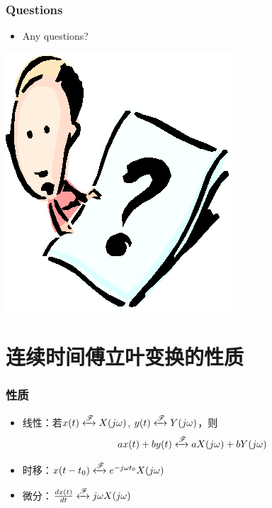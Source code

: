 \documentclass[CJKutf8,dvipsnames,table]{beamer}
\begin{document}
\begin{CJK*}{UTF8}{song}
  \begin{frame}
    \frametitle{Questions}
    \begin{itemize}
    \item Any questions?
    \end{itemize}
    \begin{center}
      \includegraphics[scale=.5]{question}
    \end{center}
  \end{frame}   

	\section{连续时间傅立叶变换的性质}

  \begin{frame}
    \frametitle{性质}
    \begin{itemize}
    \item 线性：若$x(t) \xleftrightarrow{\mathscr{F}} X(j\omega)$, $y(t)\xleftrightarrow{\mathscr{F}}Y(j\omega)$，则
    \[
    ax(t)+by(t) \xleftrightarrow{\mathscr{F}} aX(j\omega)+bY(j\omega)
    \]
    \item 时移：$x(t-t_0) \xleftrightarrow{\mathscr{F}} e^{-j\omega t_0}X(j\omega)$
    \item 微分：$\frac{dx(t)}{dt} \xleftrightarrow{\mathscr{F}} j\omega X(j\omega)$
	\end{itemize}
  \end{frame}    


\end{CJK*}
\end{document}
